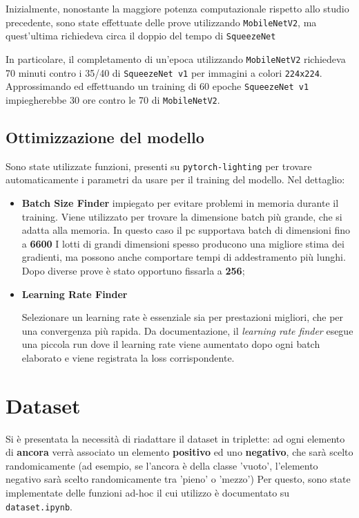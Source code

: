 \documentclass[11pt]{article}
\begin{document}
Inizialmente, nonostante la maggiore potenza computazionale rispetto allo studio precedente,
sono state effettuate delle prove utilizzando \texttt{MobileNetV2}, ma quest'ultima richiedeva
circa il doppio del tempo di \texttt{SqueezeNet}

In particolare, il completamento di un'epoca utilizzando \texttt{MobileNetV2} richiedeva 70 minuti
contro i 35/40 di \texttt{SqueezeNet v1} per immagini a colori \texttt{224x224}. Approssimando ed effettuando un training di 60 epoche \texttt{SqueezeNet v1} impiegherebbe 30 ore contro le 70 di \texttt{MobileNetV2}.

\subsection{Ottimizzazione del modello}

Sono state utilizzate funzioni, presenti su \texttt{pytorch-lighting} per trovare automaticamente i parametri da usare per il training del modello.
Nel dettaglio:

\begin{itemize}
    \item {\textbf{Batch Size Finder} 
        impiegato per evitare problemi in memoria durante il training. Viene utilizzato
        per trovare la dimensione batch più grande, che si adatta alla memoria. In questo caso il pc supportava batch di dimensioni fino a \textbf{6600} I lotti di grandi
        dimensioni spesso producono una migliore stima dei gradienti,
        ma possono anche comportare tempi di addestramento più lunghi. Dopo diverse prove è stato
        opportuno fissarla a \textbf{256}; 
    }
    \item \textbf{Learning Rate Finder} {

        Selezionare un learning rate è essenziale sia per
        prestazioni migliori, che per una convergenza più rapida. Da documentazione,
        il \textit{learning rate finder} esegue una piccola run dove il learning rate viene aumentato dopo ogni batch elaborato
        e viene registrata la loss corrispondente.
    }

\end{itemize}

\section{Dataset}

Si è presentata la necessità di riadattare il dataset in triplette: ad ogni elemento di \textbf{ancora} verrà
associato un elemento \textbf{positivo} ed uno \textbf{negativo}, che sarà scelto randomicamente 
(ad esempio, se l'ancora è della classe 'vuoto', l'elemento negativo sarà scelto randomicamente tra 'pieno' o 'mezzo')
Per questo, sono state implementate delle funzioni ad-hoc il cui utilizzo è documentato su \texttt{dataset.ipynb}. 
\end{document}
